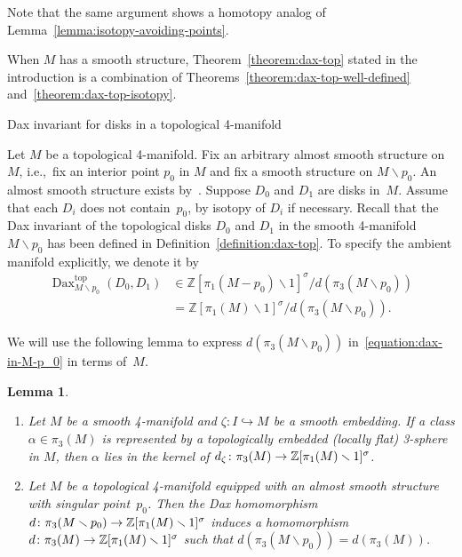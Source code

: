 \documentclass[11pt]{amsart}
\makeatletter
\def\subsection{\@startsection{subsection}{2}%
  \z@{-.8\linespacing\@plus-.3\linespacing}{.5\linespacing\@plus.2\linespacing}%
  {\normalfont\bfseries\large}}
\def\to{\mathchoice{\longrightarrow}{\rightarrow}{\rightarrow}{\rightarrow}}
\newtheorem{lemma}[theorem]{Lemma}
\theoremstyle{definition}
\theoremstyle{theorem-giventitle}
\theoremstyle{definition-giventitle}
\numberwithin{equation}{section}
\def\Z{\mathbb{Z}}
\def\top{\mathrm{top}}
\def\Dax{\operatorname{Dax}}
\def\setminus{\smallsetminus}
\makeatother
\begin{document}
Note that the same argument shows a homotopy analog of Lemma~\ref{lemma:isotopy-avoiding-points}.

When $M$ has a smooth structure, Theorem~\ref{theorem:dax-top} stated in the introduction is a combination of Theorems~\ref{theorem:dax-top-well-defined} and~\ref{theorem:dax-top-isotopy}.


\subsection{Dax invariant for disks in a topological 4-manifold}
\label{subsection:dax-in-top-4-manifold}

Let $M$ be a topological 4-manifold.
Fix an arbitrary almost smooth structure on~$M$, i.e.,\ fix an interior point $p_0$ in $M$ and fix a smooth structure on $M\setminus p_0$.
An almost smooth structure exists by~\cite[Theorem~8.2]{Freedman-Quinn:1990-1}.
Suppose $D_0$ and $D_1$ are disks in~$M$.
Assume that each $D_i$ does not contain~$p_0$, by isotopy of $D_i$ if necessary.
Recall that the Dax invariant of the topological disks $D_0$ and $D_1$ in the smooth 4-manifold $M\setminus p_0$ has been defined in Definition~\ref{definition:dax-top}.
To specify the ambient manifold explicitly, we denote it by
\begin{equation}
  \begin{aligned}
    \Dax^\top_{M\setminus p_0}(D_0,D_1) & \in \Z[\pi_1(M-p_0)\setminus 1]^\sigma / d(\pi_3(M \setminus p_0))
    \\
    & = \Z[\pi_1(M)\setminus 1]^\sigma / d(\pi_3(M \setminus p_0)).
  \end{aligned}
  \label{equation:dax-in-M-p_0}
\end{equation}


We will use the following lemma to express $d(\pi_3(M \setminus p_0))$ in~\eqref{equation:dax-in-M-p_0} in terms of~$M$.

\begin{lemma}
  \label{lemma:dax-homomorphism-on-embedded-3-sphere}
  \begin{enumerate}
    \item Let $M$ be a smooth 4-manifold and $\zeta\colon I\hookrightarrow M$ be a smooth embedding.
    If a class $\alpha\in\pi_3(M)$ is represented by a topologically embedded (locally flat) 3-sphere in $M$, then $\alpha$ lies in the kernel of $d_{\zeta}\colon \pi_3(M)\to \Z[\pi_1(M)\setminus 1]^\sigma$.
    \item Let $M$ be a topological 4-manifold equipped with an almost smooth structure with singular point~$p_0$.
    Then the Dax homomorphism $d \colon \pi_3(M\setminus p_0)\to \Z[\pi_1(M)\setminus 1]^\sigma$ induces a homomorphism $d\colon \pi_3(M)\to \Z[\pi_1(M)\setminus 1]^\sigma$ such that $d(\pi_3(M\setminus p_0)) = d(\pi_3(M))$.
  \end{enumerate}
\end{lemma}
\end{document}
